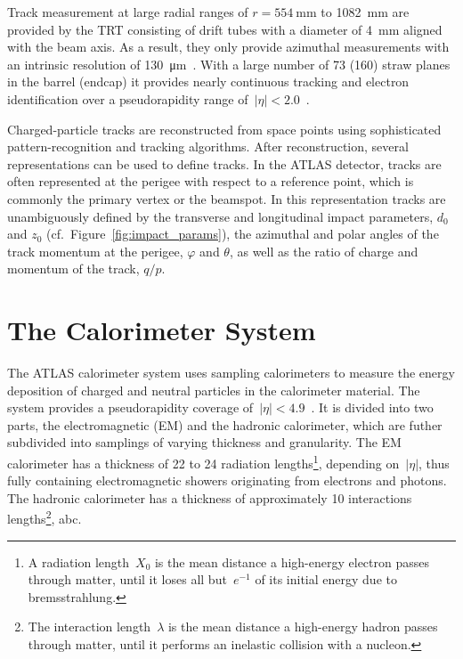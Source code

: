 Track measurement at large radial ranges of $r = \SI{554}{\milli\metre}$ to
\SI{1082}{\milli\metre} are provided by the TRT consisting of drift tubes with a
diameter of \SI{4}{\milli\metre} aligned with the beam axis. As a result, they
only provide azimuthal measurements with an intrinsic resolution of
\SI{130}{\micro\metre}~\cite{atlas_detector}. With a large number of 73 (160)
straw planes in the barrel (endcap) it provides nearly continuous tracking and
electron identification over a pseudorapidity range
of~$|\eta| < 2.0$~\cite{atlas_detector}.

Charged-particle tracks are reconstructed from space points using sophisticated
pattern-recognition and tracking algorithms. After reconstruction, several
representations can be used to define tracks. In the ATLAS detector, tracks are
often represented at the perigee with respect to a reference point, which is
commonly the primary vertex or the beamspot. In this representation tracks are
unambiguously defined by the transverse and longitudinal impact parameters,
$d_0$ and $z_0$ (cf.\ Figure~\ref{fig:impact_params}), the azimuthal and polar
angles of the track momentum at the perigee, $\varphi$ and $\theta$, as well as
the ratio of charge and momentum of the track, $q / p$.


\section{The Calorimeter System}
\label{sec:atlas_calo}

The ATLAS calorimeter system uses sampling calorimeters to measure the energy
deposition of charged and neutral particles in the calorimeter material. The
system provides a pseudorapidity coverage
of~$|\eta| < 4.9$~\cite{atlas_detector}. It is divided into two parts, the
electromagnetic (EM) and the hadronic calorimeter, which are futher subdivided
into samplings of varying thickness and granularity. The EM calorimeter has a
thickness of 22 to 24 radiation lengths\footnote{A radiation length~$X_0$ is the
  mean distance a high-energy electron passes through matter, until it loses all
  but~$e^{-1}$ of its initial energy due to bremsstrahlung.}, depending
on~$|\eta|$, thus fully containing electromagnetic showers originating from
electrons and photons. The hadronic calorimeter has a thickness of approximately
10 interactions lengths\footnote{The interaction length~$\lambda$ is the mean
  distance a high-energy hadron passes through matter, until it performs an
  inelastic collision with a nucleon.}, abc.

